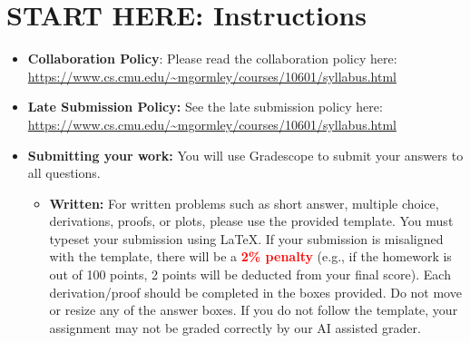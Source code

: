 \newcommand \maxsubs {10 }
\section*{START HERE: Instructions}
\begin{itemize}

\item \textbf{Collaboration Policy}: Please read the collaboration policy here: \url{https://www.cs.cmu.edu/~mgormley/courses/10601/syllabus.html}

\item\textbf{Late Submission Policy:} See the late submission policy here: \url{https://www.cs.cmu.edu/~mgormley/courses/10601/syllabus.html}

\item\textbf{Submitting your work:} You will use Gradescope to submit
  your answers to all questions.

  \begin{itemize}

   \item \textbf{Written:} For written problems such as short answer, multiple choice, derivations, proofs, or plots, please use the provided template. You must typeset your submission using \LaTeX{}. If your submission is misaligned with the template, there will be a \textbf{\textcolor{red}{2\% penalty}} (e.g., if the homework is out of 100 points, 2 points will be deducted from your final score). 
   Each derivation/proof should be completed in the boxes provided. Do not move or resize any of the answer boxes. If you do not follow the template, your assignment may not be graded correctly by our AI assisted grader.
  \end{itemize}

\end{itemize}